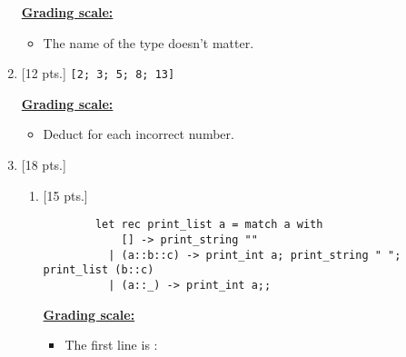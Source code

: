 \documentclass[11pt,fleqn]{article}
\begin{document}
\begin{enumerate}
\begin{info}{\textbf{\underline{Grading scale:}}}
\begin{itemize}
              \item The name of the type doesn't matter.

            \end{itemize}

          \end{info}

    \item {[12 pts.]} \texttt{[2; 3; 5; 8; 13]}

          \begin{info}{\textbf{\underline{Grading scale:}}}

            \begin{itemize}

              \addtolength{\itemsep}{2mm}

              \item Deduct  for each incorrect number.

            \end{itemize}

          \end{info}

          \pagebreak

    \item {[18 pts.]}

          \vspace{-1.5mm}

          \begin{enumerate}

            \addtolength{\itemsep}{6mm}

            \item {{[15 pts.]}}

                  \begin{Verbatim}
        let rec print_list a = match a with
            [] -> print_string ""
          | (a::b::c) -> print_int a; print_string " "; print_list (b::c)
          | (a::_) -> print_int a;;
                  \end{Verbatim}

                  \begin{info}{\textbf{\underline{Grading scale:}}}

                    \begin{itemize}

                      \addtolength{\itemsep}{3mm}

                      \item The first line is :


\end{itemize}
\end{info}
\end{enumerate}
\end{enumerate}
\end{document}

